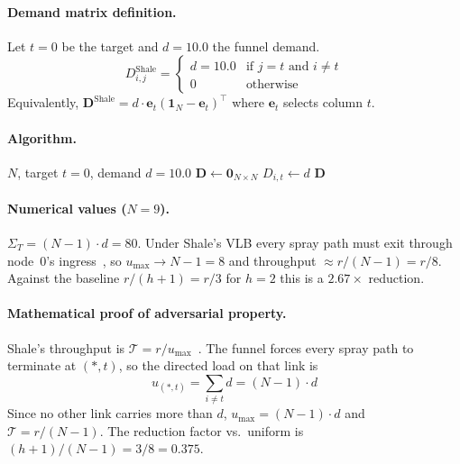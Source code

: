\documentclass{article}
\begin{document}
    \paragraph{Demand matrix definition.}  Let $t = 0$ be the target and $d = 10.0$ the funnel demand.
    \begin{equation}
        D^{\text{Shale}}_{i,j} =
        \begin{cases}
            d = 10.0 & \text{if } j = t \text{ and } i \neq t \\
            0        & \text{otherwise}
        \end{cases}
        \label{eq:matrix_shale}
    \end{equation}
    Equivalently, $\mathbf{D}^{\text{Shale}} = d\cdot \mathbf{e}_t (\mathbf{1}_N - \mathbf{e}_t)^\top$ where $\mathbf{e}_t$ selects column $t$.

    \paragraph{Algorithm.}
    \begin{algorithmic}[1]
        \Require $N$, target $t=0$, demand $d=10.0$
        \State $\mathbf{D} \gets \mathbf{0}_{N \times N}$
                $D_{i,t} \gets d$
            \EndIf
        \EndFor
        \State \Return $\mathbf{D}$
    \end{algorithmic}

    \paragraph{Numerical values ($N=9$).}  $\Sigma_T = (N{-}1)\cdot d = 80$.  Under Shale's VLB every spray path must exit through node~$0$'s ingress~\cite{shale}, so $u_{\max} \to N{-}1 = 8$ and throughput $\approx r/(N{-}1) = r/8$.  Against the baseline $r/(h{+}1) = r/3$ for $h=2$ this is a $2.67\times$ reduction.

    \paragraph{Mathematical proof of adversarial property.}  Shale's throughput is $\mathcal{T} = r / u_{\max}$~\cite{shale}.  The funnel forces every spray path to terminate at $(*, t)$, so the directed load on that link is
    \[
        u_{(*,t)} = \sum_{i\neq t} d = (N{-}1)\cdot d
    \]
    Since no other link carries more than $d$, $u_{\max} = (N{-}1)\cdot d$ and $\mathcal{T} = r/(N{-}1)$.  The reduction factor vs.\ uniform is $(h{+}1)/(N{-}1) = 3/8 = 0.375$.
\end{document}
